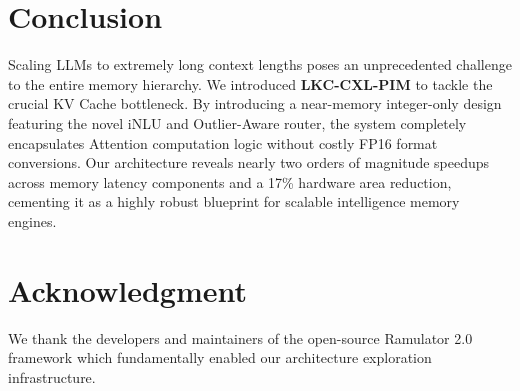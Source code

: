 \documentclass[10pt,conference]{IEEEtran}
\begin{document}
\section{Conclusion}

Scaling LLMs to extremely long context lengths poses an unprecedented challenge to the entire memory hierarchy. We introduced \textbf{LKC-CXL-PIM} to tackle the crucial KV Cache bottleneck. By introducing a near-memory integer-only design featuring the novel iNLU and Outlier-Aware router, the system completely encapsulates Attention computation logic without costly FP16 format conversions. Our architecture reveals nearly two orders of magnitude speedups across memory latency components and a 17\% hardware area reduction, cementing it as a highly robust blueprint for scalable intelligence memory engines.

\section*{Acknowledgment}

We thank the developers and maintainers of the open-source Ramulator 2.0 framework which fundamentally enabled our architecture exploration infrastructure.
\end{document}
